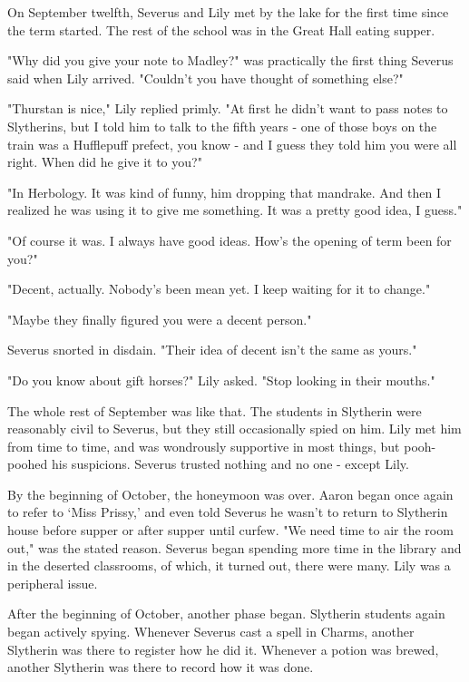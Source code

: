 On September twelfth, Severus and Lily met by the lake for the first time since the term started. The rest of the school was in the Great Hall eating supper.

"Why did you give your note to Madley?" was practically the first thing Severus said when Lily arrived. "Couldn't you have thought of something else?"

"Thurstan is nice," Lily replied primly. "At first he didn't want to pass notes to Slytherins, but I told him to talk to the fifth years - one of those boys on the train was a Hufflepuff prefect, you know - and I guess they told him you were all right. When did he give it to you?"

"In Herbology. It was kind of funny, him dropping that mandrake. And then I realized he was using it to give me something. It was a pretty good idea, I guess."

"Of course it was. I always have good ideas. How's the opening of term been for you?"

"Decent, actually. Nobody's been mean yet. I keep waiting for it to change."

"Maybe they finally figured you were a decent person."

Severus snorted in disdain. "Their idea of decent isn't the same as yours."

"Do you know about gift horses?" Lily asked. "Stop looking in their mouths."

The whole rest of September was like that. The students in Slytherin were reasonably civil to Severus, but they still occasionally spied on him. Lily met him from time to time, and was wondrously supportive in most things, but pooh-poohed his suspicions. Severus trusted nothing and no one - except Lily.

By the beginning of October, the honeymoon was over. Aaron began once again to refer to `Miss Prissy,' and even told Severus he wasn't to return to Slytherin house before supper or after supper until curfew. "We need time to air the room out," was the stated reason. Severus began spending more time in the library and in the deserted classrooms, of which, it turned out, there were many. Lily was a peripheral issue.

After the beginning of October, another phase began. Slytherin students again began actively spying. Whenever Severus cast a spell in Charms, another Slytherin was there to register how he did it. Whenever a potion was brewed, another Slytherin was there to record how it was done.

